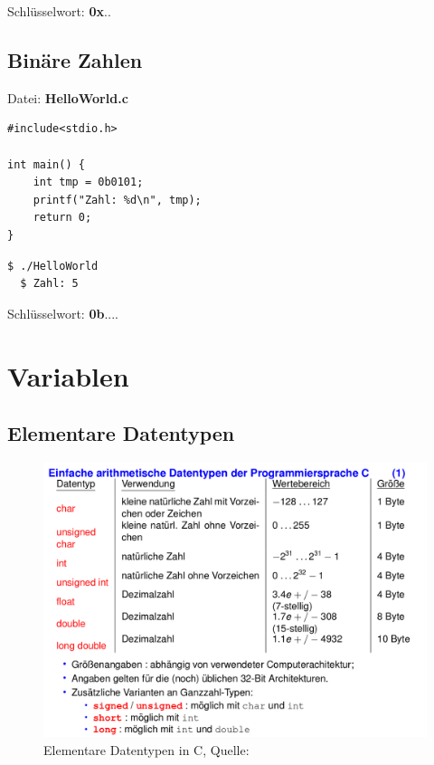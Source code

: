 \documentclass[11pt,a4paper,ngerman, fleqn]{article}
\let\noi\noindent
\let\tbf\textbf
\begin{document}
\noi Schlüsselwort: \tbf{0x}..


\subsection{Binäre Zahlen}
\label{sec:14}


Datei: \tbf{HelloWorld.c}

\begin{lstlisting}
#include<stdio.h>

int main() {
	int tmp = 0b0101;
	printf("Zahl: %d\n", tmp);
	return 0;
}
\end{lstlisting}

\begin{lstlisting}[language=bash,  backgroundcolor=\color{pureblack}, basicstyle=\ttfamily\footnotesize\color{purewhite}, rulecolor=\color{slightgray}]
  $ ./HelloWorld
  $ Zahl: 5
\end{lstlisting}

\noi Schlüsselwort: \tbf{0b}....

\section{Variablen}
\subsection{Elementare Datentypen}
\label{sec:21}


\begin{figure}[H]
	\centering
	\includegraphics[width=1\textwidth]{ElementareDatentypen.png}
	\caption{Elementare Datentypen in C, Quelle: \cite{2}}
	\label{fig:2}
\end{figure}
\end{document}
